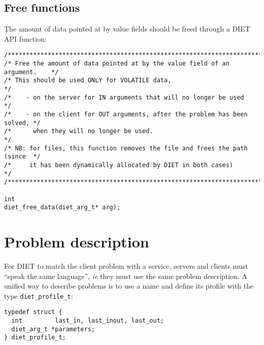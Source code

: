 \subsection{Free functions}
\label{sec:freefun}

The amount of data  pointed at by value fields should be freed through a DIET
API function:
{\footnotesize
\begin{verbatim}
/****************************************************************************/
/* Free the amount of data pointed at by the value field of an argument.    */
/* This should be used ONLY for VOLATILE data,                              */
/*    - on the server for IN arguments that will no longer be used          */
/*    - on the client for OUT arguments, after the problem has been solved, */
/*      when they will no longer be used.                                   */
/* NB: for files, this function removes the file and frees the path (since  */
/*     it has been dynamically allocated by DIET in both cases)             */
/****************************************************************************/

int
diet_free_data(diet_arg_t* arg);
\end{verbatim}
}


\section{Problem description}
\label{sec:pbdesc}

For DIET to match the client problem with a service, servers and clients must
``speak the same language'', \emph{ie} they must use the same problem
description. A unified way to describe problems is to use a name and define its
profile with the type \texttt{diet\_profile\_t}:
{\footnotesize
\begin{verbatim}
typedef struct {
  int         last_in, last_inout, last_out;
  diet_arg_t *parameters;
} diet_profile_t;
\end{verbatim}
}

%
%

